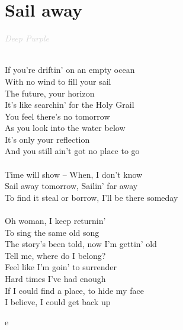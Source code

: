 \documentclass[a5paper, 10pt]{book}
\begin{document}
\newpage
\section{Sail away}\textcolor{lightgray}{\textit{Deep Purple}}\\~\\
\begin{minipage}[t]{0.8\textwidth}
If you’re driftin’ on an empty ocean\\
With no wind to fill your sail\\
The future, your horizon\\
It’s like searchin’ for the Holy Grail\\
You feel there’s no tomorrow\\
As you look into the water below\\
It’s only your reflection\\
And you still ain’t got no place to go\\
\\
\hspace*{5mm}Time will show – When, I don’t know\\
\hspace*{5mm}Sail away tomorrow, Sailin’ far away\\
\hspace*{5mm}To find it steal or borrow, I’ll be there someday\\
\\
Oh woman, I keep returnin’\\
To sing the same old song\\
The story’s been told, now I’m gettin’ old\\
Tell me, where do I belong?\\
Feel like I’m goin’ to surrender\\
Hard times I’ve had enough\\
If I could find a place, to hide my face\\
I believe, I could get back up\\
\end{minipage}
\begin{minipage}[t]{0.2\textwidth}
e
\end{minipage}

\newpage
\end{document}
